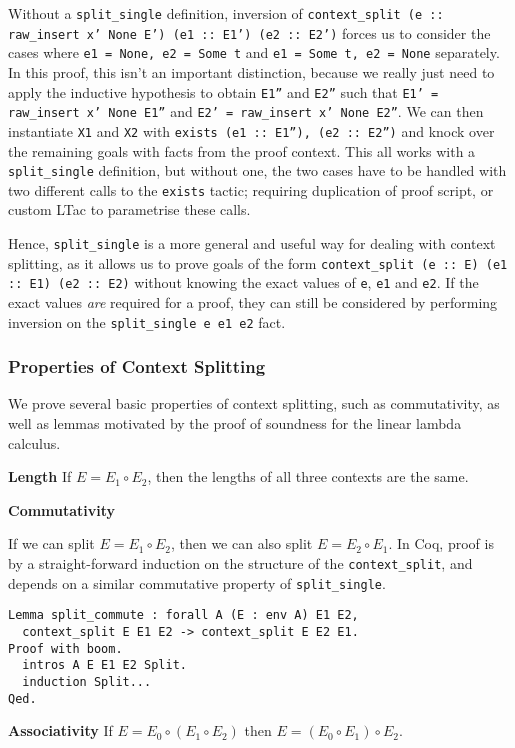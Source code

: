 \documentclass[]{unswthesis}
\let\c\texttt
\let\i\textit
\begin{document}
Without a \c{split_single} definition, inversion of \c{context_split (e :: raw_insert x' None E') (e1 :: E1') (e2 :: E2')} forces us to consider the cases where \c{e1 = None, e2 = Some t} and \c{e1 = Some t, e2 = None} separately. In this proof, this isn't an important distinction, because we really just need to apply the inductive hypothesis to obtain \c{E1''} and \c{E2''} such that \c{E1' = raw_insert x' None E1''} and \c{E2' = raw_insert x' None E2''}. We can then instantiate \c{X1} and \c{X2} with \c{exists (e1 :: E1''), (e2 :: E2'')} and knock over the remaining goals with facts from the proof context. This all works with a \c{split_single} definition, but without one, the two cases have to be handled with two different calls to the \c{exists} tactic; requiring duplication of proof script, or custom LTac to parametrise these calls.

Hence, \c{split_single} is a more general and useful way for dealing with context splitting, as it allows us to prove goals of the form \c{context_split (e :: E) (e1 :: E1) (e2 :: E2)} without knowing the exact values of \c{e}, \c{e1} and \c{e2}. If the exact values \i{are} required for a proof, they can still be considered by performing inversion on the \c{split_single e e1 e2} fact.

\subsubsection{Properties of Context Splitting}

We prove several basic properties of context splitting, such as commutativity, as well as lemmas motivated by the proof of soundness for the linear lambda calculus.

\textbf{Length} If $E = E_1 \circ E_2$, then the lengths of all three contexts are the same.

\textbf{Commutativity}

If we can split $E = E_1 \circ E_2$, then we can also split $E = E_2 \circ E_1$. In Coq, proof is by a straight-forward induction on the structure of the \c{context_split}, and depends on a similar commutative property of \c{split_single}.

\begin{verbatim}
Lemma split_commute : forall A (E : env A) E1 E2,
  context_split E E1 E2 -> context_split E E2 E1.
Proof with boom.
  intros A E E1 E2 Split.
  induction Split...
Qed.
\end{verbatim}

\textbf{Associativity} If $E = E_0 \circ (E_1 \circ E_2)$ then $E = (E_0 \circ E_1) \circ E_2$.
\end{document}
